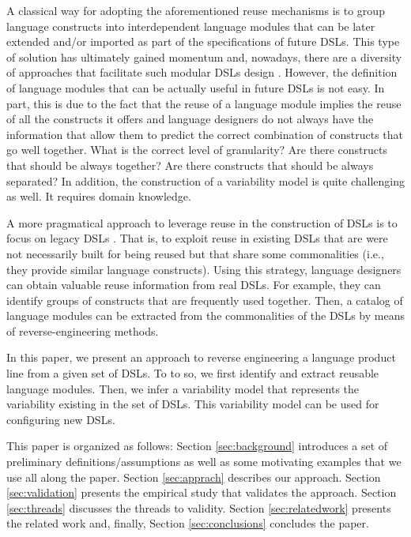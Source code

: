 A classical way for adopting the aforementioned reuse mechanisms is to group language constructs into interdependent language modules that can be later extended and/or imported as part of the specifications of future DSLs. This type of solution has ultimately gained momentum and, nowadays, there are a diversity of approaches that facilitate such modular DSLs design \cite{Vacchi:2015,Mernik:2013,Rumpe:2010}. However, the definition of language modules that can be actually useful in future DSLs is not easy. In part, this is due to the fact that the reuse of a language module implies the reuse of all the constructs it offers and language designers do not always have the information that allow them to predict the correct combination of constructs that go well together. What is the correct level of granularity? Are there constructs that should be always together? Are there constructs that should be always separated? In addition, the construction of a variability model is quite challenging as well. It requires domain knowledge.

A more pragmatical approach to leverage reuse in the construction of DSLs is to focus on legacy DSLs \cite{degueule:2015}. That is, to exploit reuse in existing DSLs that are were not necessarily built for being reused but that share some commonalities (i.e., they provide similar language constructs). Using this strategy, language designers can obtain valuable reuse information from real DSLs. For example, they can identify groups of constructs that are frequently used together. Then, a catalog of language modules can be extracted from the commonalities of the DSLs by means of reverse-engineering methods. 

In this paper, we present an approach to reverse engineering a language product line from a given set of DSLs. To to so, we first identify and extract reusable language modules. Then, we infer a variability model that represents the variability existing in the set of DSLs. This variability model can be used for configuring new DSLs. 

This paper is organized as follows: Section \ref{sec:background} introduces a set of preliminary definitions/assumptions as well as some motivating examples that we use all along the paper. Section \ref{sec:apprach} describes our approach. Section \ref{sec:validation} presents the empirical study that validates the approach. Section \ref{sec:threads} discusses the threads to validity. Section \ref{sec:relatedwork} presents the related work and, finally, Section \ref{sec:conclusions} concludes the paper. 

